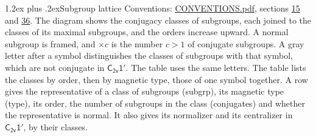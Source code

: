 \documentclass[10pt,a4paper]{article}
\makeatletter
\renewcommand\section{\@startsection{section}{1}{\z@}{-3ex plus -1ex minus -.2ex}%
  {1.2ex plus .2ex}{\normalfont\large\sffamily\bfseries\color{parttitle}}}
\numberwithin{equation}{section}
\newcommand{\grp}[1]{\mathsf{#1}}
\makeatother
\begin{document}
\section{Subgroup lattice}\label{s:subgroups}
Conventions: \href{../../CONVENTIONS.pdf}{CONVENTIONS.pdf}, sections \href{../../../rotation/CONVENTIONS.pdf\#conv.15}{15} and \href{../../CONVENTIONS.pdf\#conv.36}{36}.
The diagram shows the conjugacy classes of subgroups, each joined to the classes of its maximal subgroups, and the orders increase upward. \label{n:index.conjugates.c}A normal subgroup is framed, and ${\times}c$ is the number $c > 1$ of conjugate subgroups. \label{n:mark.letter}A gray letter after a symbol distinguishes the classes of subgroups with that symbol, which are not conjugate in $\grp{C_{2v}1'}$. The table uses the same letters. The table lists the classes by order, then by magnetic type, those of one symbol together. \label{n:head.subgroup}\label{n:head.magnetic.type}\label{n:head.order}\label{n:head.conjugates}\label{n:head.normal}A row gives the representative of a class of subgroups (subgrp), its magnetic type (type), its order, the number of subgroups in the class (conjugates) and whether the representative is normal. \label{n:head.normalizer}\label{n:head.centralizer}It also gives its normalizer and its centralizer in $\grp{C_{2v}1'}$, by their classes. 
\end{document}
